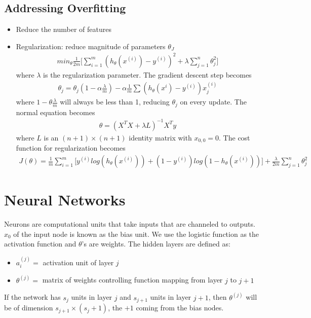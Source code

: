 \documentclass[12pt]{article}
\begin{document}
\subsection{Addressing Overfitting}
\begin{itemize}
	\item Reduce the number of features
	\item Regularization: reduce magnitude of parameters $\theta_J$ \begin{align*}
		min_\theta \frac{1}{2m}\bigg[\sum_{i=1}^{m}(h_\theta(x^{(i)})-y^{(i)})^2 + \lambda\sum_{j=1}^{n}\theta_j^2\bigg]
	\end{align*} where $\lambda$ is the regularization parameter. The gradient descent step becomes \begin{align*}
		\theta_j = \theta_j (1-\alpha\frac{\lambda}{m})-\alpha\frac{1}{m}\sum (h_\theta(x^{i})-y^{(i)})x_j^{(i)}
	\end{align*} where $1-\theta\frac{\lambda}{m}$ will always be less than 1, reducing $\theta_j$ on every update. The normal equation becomes \begin{align*}
		\theta = (X^TX + \lambda L)^{-1}X^Ty
	\end{align*} where $L$ is an $(n+1)\times (n+1)$ identity matrix with $x_{0,0}=0$. The cost function for regularization becomes \begin{align*}
		J(\theta) = \frac{1}{m}\sum_{i=1}^{m}\bigg[y^{(i)}log(h_\theta(x^{(i)}))+(1-y^{(i)})log(1-h_\theta(x^{(i)}))\bigg]+\frac{\lambda}{2m}\sum_{j=1}^{n}\theta_j^2
	\end{align*}
\end{itemize}

\section{Neural Networks}
Neurons are computational units that take inputs that are channeled to outputs. $x_0$ of the input node is known as the bias unit. We use the logistic function as the activation function and $\theta$'s are weights.
The hidden layers are defined as:
\begin{itemize}
	\item $a_i^{(j)} =$ activation unit of layer $j$
	\item $\theta^{(j)} =$ matrix of weights controlling function mapping from layer $j$ to $j+1$
\end{itemize}
If the network has $s_j$ units in layer $j$ and $s_{j+1}$ units in layer $j+1$, then $\theta^{(j)}$ will be of dimension $s_{j+1}\times (s_j+1)$, the $+1$ coming from the bias nodes.
\end{document}
